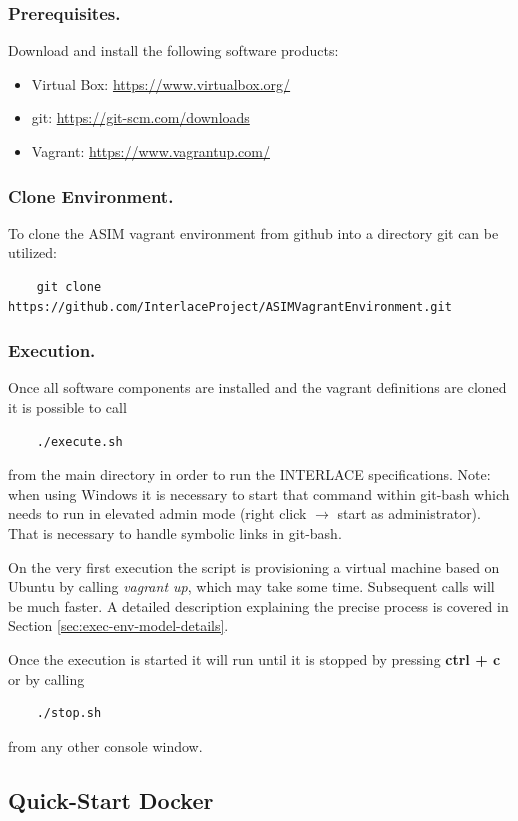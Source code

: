 \subsubsection{Prerequisites.\ \ }
Download and install the following software products:
\begin{itemize}
	\item Virtual Box: \url{https://www.virtualbox.org/}
	\item git: \url{https://git-scm.com/downloads}
	\item Vagrant: \url{https://www.vagrantup.com/}
\end{itemize}

\subsubsection{Clone Environment.\ \ }
To clone the ASIM vagrant environment from github into a directory git can be utilized:
\begin{lstlisting}
	git clone https://github.com/InterlaceProject/ASIMVagrantEnvironment.git
\end{lstlisting}

\subsubsection{Execution.\ \ }
Once all software components are installed and the vagrant definitions are cloned it is possible to call
\begin{lstlisting}
	./execute.sh
\end{lstlisting}
from the main directory in order to run the INTERLACE specifications. Note: when using Windows it is necessary to start that command within git-bash which needs to run in elevated admin mode (right click $\rightarrow$ start as administrator). That is necessary to handle symbolic links in git-bash.

On the very first execution the script is provisioning a virtual machine based on Ubuntu by calling \textit{vagrant up}, which may take some time. Subsequent calls will be much faster. A detailed description explaining the precise process is covered in Section \ref{sec:exec-env-model-details}.

Once the execution is started it will run until it is stopped by pressing \textbf{ctrl + c} or by calling
\begin{lstlisting}
	./stop.sh
\end{lstlisting}
from any other console window.

\subsection{Quick-Start Docker}
\label{sec:quick-start-docker}

